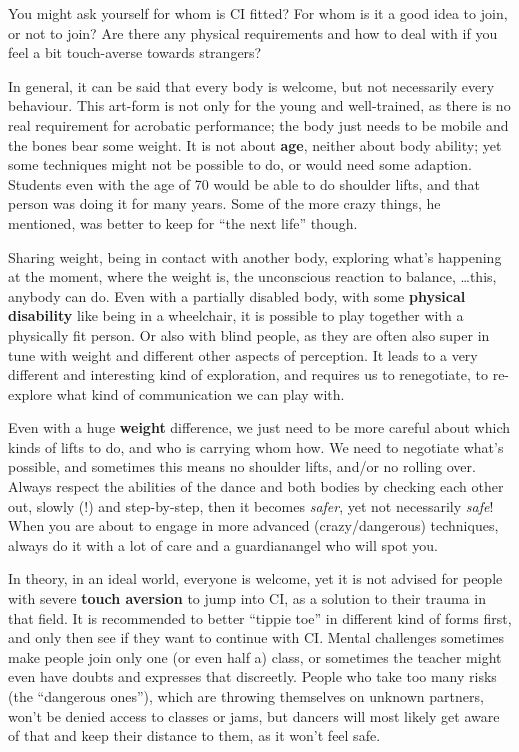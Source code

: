 You might ask yourself for whom is CI fitted?
For whom is it a good idea to join, or not to join?
Are there any physical requirements and how to deal with if you feel a bit touch-averse towards strangers?

In general, it can be said that every body is welcome, but not necessarily every behaviour.
This art-form is not only for the young and well-trained, as there is no real requirement for acrobatic performance; the body just needs to be mobile and the bones bear some weight.
It is not about \textbf{age}, neither about body ability; yet some techniques might not be possible to do, or would need some adaption.
Students even with the age of 70 would be able to do shoulder lifts, and that person was doing it for many years.
Some of the more crazy things, he mentioned, was better to keep for ``the next life'' though.

Sharing weight, being in contact with another body, exploring what's happening at the moment, where the weight is, the unconscious reaction to balance, \ldots this, anybody can do.
Even with a partially disabled body, with some \textbf{physical disability} like being in a wheelchair, it is possible to play together with a physically fit person.
Or also with blind people, as they are often also super in tune with weight and different other aspects of perception.
It leads to a very different and interesting kind of exploration, and requires us to renegotiate, to re-explore what kind of communication we can play with.

Even with a huge \textbf{weight} difference, we just need to be more careful about which kinds of lifts to do, and who is carrying whom how.
We need to negotiate what's possible, and sometimes this means no shoulder lifts, and/or no rolling over.
Always respect the abilities of the dance and both bodies by checking each other out, slowly (!) and step-by-step, then it becomes \textit{safer}, yet not necessarily \textit{safe}!
When you are about to engage in more advanced (crazy/dangerous) techniques, always do it with a lot of care and a \gls{guardianangel} who will spot you.

In theory, in an ideal world, everyone is welcome, yet it is not advised for people with severe \textbf{touch aversion} to jump into CI, as a solution to their trauma in that field.
It is recommended to better ``tippie toe'' in different kind of forms first, and only then see if they want to continue with CI\@.
Mental challenges sometimes make people join only one (or even half a) class, or sometimes the teacher might even have doubts and expresses that discreetly.
People who take too many risks (the ``dangerous ones''), which are throwing themselves on unknown partners, won't be denied access to classes or jams, but dancers will most likely get aware of that and keep their distance to them, as it won't feel safe.

